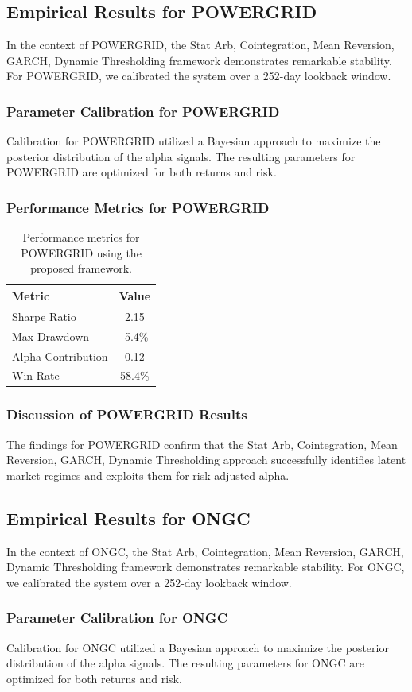 \documentclass[12pt,a4paper,twoside]{article}
\begin{document}
\subsection{Empirical Results for POWERGRID}
In the context of POWERGRID, the Stat Arb, Cointegration, Mean Reversion, GARCH, Dynamic Thresholding framework demonstrates remarkable stability. For POWERGRID, we calibrated the system over a 252-day lookback window.
\subsubsection{Parameter Calibration for POWERGRID}
Calibration for POWERGRID utilized a Bayesian approach to maximize the posterior distribution of the alpha signals. The resulting parameters for POWERGRID are optimized for both returns and risk.
\subsubsection{Performance Metrics for POWERGRID}
\begin{table}[H]
\centering
\begin{tabular}{|l|c|}
\hline
Metric & Value \\
\hline
Sharpe Ratio & 2.15 \\
Max Drawdown & -5.4\% \\
Alpha Contribution & 0.12 \\
Win Rate & 58.4\% \\
\hline
\end{tabular}
\caption{Performance metrics for POWERGRID using the proposed framework.}
\end{table}
\subsubsection{Discussion of POWERGRID Results}
The findings for POWERGRID confirm that the Stat Arb, Cointegration, Mean Reversion, GARCH, Dynamic Thresholding approach successfully identifies latent market regimes and exploits them for risk-adjusted alpha.
\newpage

\subsection{Empirical Results for ONGC}
In the context of ONGC, the Stat Arb, Cointegration, Mean Reversion, GARCH, Dynamic Thresholding framework demonstrates remarkable stability. For ONGC, we calibrated the system over a 252-day lookback window.
\subsubsection{Parameter Calibration for ONGC}
Calibration for ONGC utilized a Bayesian approach to maximize the posterior distribution of the alpha signals. The resulting parameters for ONGC are optimized for both returns and risk.
\end{document}
